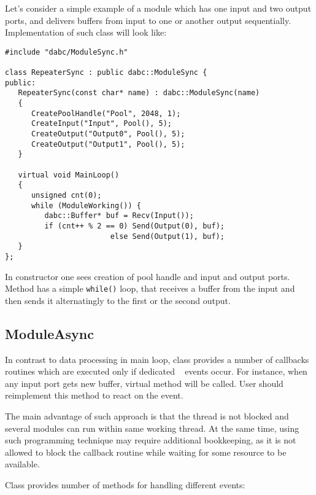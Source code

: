 Let's consider a simple example of a  module 
which has one input and two output ports, and delivers buffers from input to
one or another output sequentially. Implementation of such 
class will look like:
\begin{small}
\begin{verbatim}
#include "dabc/ModuleSync.h"

class RepeaterSync : public dabc::ModuleSync {
public:
   RepeaterSync(const char* name) : dabc::ModuleSync(name)
   {
      CreatePoolHandle("Pool", 2048, 1);
      CreateInput("Input", Pool(), 5);
      CreateOutput("Output0", Pool(), 5);
      CreateOutput("Output1", Pool(), 5);
   }
     
   virtual void MainLoop()
   {
      unsigned cnt(0);
      while (ModuleWorking()) {
         dabc::Buffer* buf = Recv(Input());
         if (cnt++ % 2 == 0) Send(Output(0), buf);
                        else Send(Output(1), buf);
   }
};
\end{verbatim}
\end{small}

In constructor one sees creation of pool handle and input and output ports.
Method  has a simple {\tt while()} loop, 
that receives a buffer from the
input and then sends it alternatingly to the first or the second output.

  
\subsection{ModuleAsync}
\label{plugin_module_async}

In contrast to data processing in  main loop,
class  provides a
number of callbacks routines which are executed only if dedicated \dabc~ events occur.
For instance, when any input port gets new buffer, virtual method 
 will
be called. User should reimplement this method to react on the event.

The main advantage of such approach is that the thread is not blocked and
several modules  can run within same working thread.
At the same time, using such programming technique may require additional 
bookkeeping, as it is not allowed to block the callback routine while waiting for
some resource to be available.

Class  provides number of methods for handling different events:

